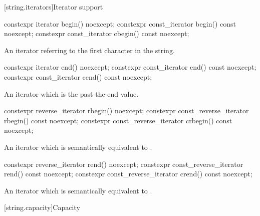 [string.iterators]{Iterator support}

%
%
\begin{itemdecl}
constexpr iterator       begin() noexcept;
constexpr const_iterator begin() const noexcept;
constexpr const_iterator cbegin() const noexcept;
\end{itemdecl}

\begin{itemdescr}
\pnum
\returns
An iterator referring to the first character in the string.
\end{itemdescr}

%
%
\begin{itemdecl}
constexpr iterator       end() noexcept;
constexpr const_iterator end() const noexcept;
constexpr const_iterator cend() const noexcept;
\end{itemdecl}

\begin{itemdescr}
\pnum
\returns
An iterator which is the past-the-end value.
\end{itemdescr}

%
%
\begin{itemdecl}
constexpr reverse_iterator       rbegin() noexcept;
constexpr const_reverse_iterator rbegin() const noexcept;
constexpr const_reverse_iterator crbegin() const noexcept;
\end{itemdecl}

\begin{itemdescr}
\pnum
\returns
An iterator which is semantically equivalent to
.
\end{itemdescr}

%
%
\begin{itemdecl}
constexpr reverse_iterator       rend() noexcept;
constexpr const_reverse_iterator rend() const noexcept;
constexpr const_reverse_iterator crend() const noexcept;
\end{itemdecl}

\begin{itemdescr}
\pnum
\returns
An iterator which is semantically equivalent to
.
\end{itemdescr}

[string.capacity]{Capacity}

